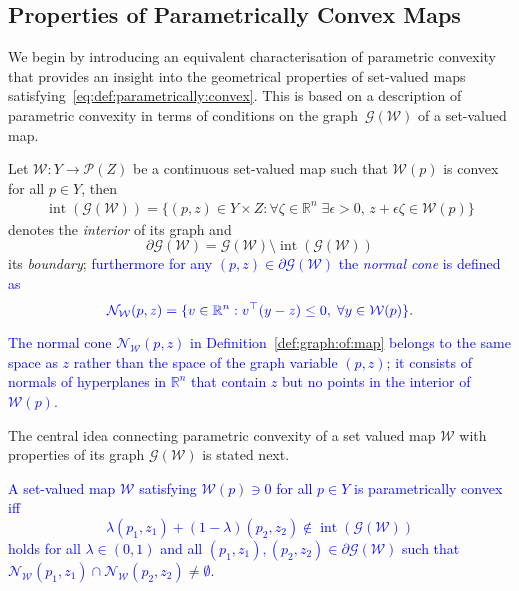 \documentclass[smallextended]{svjour3}       %
\numberwithin{equation}{section}
\DeclareMathOperator{\interior}{int}
\newcommand{\revision}[1]{\textcolor{blue}{#1}}
\begin{document}
\subsection{Properties of Parametrically Convex Maps}\label{ssec:properties:of:p:convex:maps}
%
We begin by introducing an equivalent characterisation of parametric convexity that provides an insight into the geometrical properties of 
set-valued maps satisfying~\eqref{eq:def:parametrically:convex}.
%
This is based on a description of parametric convexity in terms of conditions on the graph~$\mathscr G(\mathcal W)$ of a set-valued map.
%
\begin{definition}\label{def:graph:of:map}
Let $\mathcal W:Y\rightarrow \mathscr P(Z)$ be a continuous set-valued map
such that $\mathcal W(p)$ is convex for all $p\in Y$, then 
%
\begin{equation*}\begin{aligned}
\interior(\mathscr G(\mathcal W)) = \{(p,z) \in Y\times Z : \forall \zeta\in\mathbb R^n\;\exists \epsilon>0, \, z+\epsilon \zeta\in \mathcal W(p) \}
\end{aligned}\end{equation*}
%
denotes the \emph{interior} of its graph and
%
\[
  \partial \mathscr G(\mathcal W) = \mathscr G(\mathcal W)\setminus \interior(\mathscr G(\mathcal W))
\]
%
its \emph{boundary};
%
\revision{furthermore for any $(p,z)\in\partial\mathscr G(\mathcal W)$ the \emph{normal cone} is defined as}
%
\[
  \revision{\mathcal N_{\mathcal W} (p,z) = \{v \in\mathbb R^n: v^\top (y - z) \leq 0, \;  \forall y\in \mathcal W(p) \} .}
\]
%
\end{definition}
%
\begin{remark}
%
\revision{The normal cone $\mathcal N_{\mathcal W} (p,z)$  in  Definition~\ref{def:graph:of:map} belongs to the same space as $z$ rather than the space of the graph variable $(p,z)$; it consists of normals of hyperplanes in $\mathbb R^n$ that contain $z$ but no points in the interior of $\mathcal W(p)$.}
%
\end{remark}
%
The central idea connecting parametric convexity of a set valued map $\mathcal W$ with properties of its graph $\mathscr G(\mathcal W)$ is stated next.
%
\begin{lemma}\label{lem:p:convexity:graph}
  \revision{A set-valued map $\mathcal W$ satisfying $\mathcal W(p)\ni 0$ for all $p\in Y$
  is parametrically convex iff
%
\begin{equation}\label{eq:graph:def:p:convexity}
\lambda (p_1,z_1) + (1-\lambda) (p_2,z_2) \not\in \interior (\mathscr G(\mathcal W))
\end{equation}
%
holds for all $\lambda\in(0,1)$ and all $(p_1,z_1), (p_2,z_2)\in\partial\mathscr G(\mathcal W)$ such that  $\mathcal N_{\mathcal W}(p_1,z_1)\cap\mathcal N_{\mathcal W}(p_2,z_2)\neq\emptyset$.}
%
\end{lemma}
\end{document}
